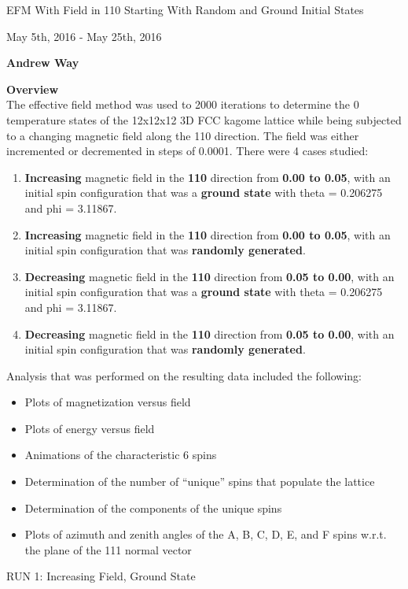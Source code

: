 \documentclass{article}
\begin{document}
\thispagestyle{plain}
\begin{center}
    \Large
    EFM With Field in 110 Starting With Random and Ground Initial States
    
    \vspace{0.4cm}
    \large
    May 5th, 2016 - May 25th, 2016
    
    \vspace{0.4cm}
    \textbf{Andrew Way}
    
    \vspace{0.9cm}
    \textbf{Overview} \\
    \vspace{5mm}
    The effective field method was used to 2000 iterations to determine the 0 temperature states of 
    the 12x12x12 3D FCC kagome lattice while being subjected to a changing magnetic field along the 110 
    direction. The field was either incremented or decremented in steps of 0.0001. 
    There were 4 cases studied:
    \begin{enumerate}
     \item \textbf{Increasing} magnetic field in the \textbf{110} direction from \textbf{0.00 to 0.05},
     with an initial 
     spin configuration that was a \textbf{ground state} with theta = 0.206275 and phi = 3.11867.
     \item \textbf{Increasing} magnetic field in the \textbf{110} direction from \textbf{0.00 to 0.05},
     with an initial 
     spin configuration that was \textbf{randomly generated}.
     \item \textbf{Decreasing} magnetic field in the \textbf{110} direction from \textbf{0.05 to 0.00},
     with an initial
     spin configuration that was a \textbf{ground state} with theta = 0.206275 and phi = 3.11867.
     \item \textbf{Decreasing} magnetic field in the \textbf{110} direction from \textbf{0.05 to 0.00},
     with an initial
     spin configuration that was \textbf{randomly generated}.
    \end{enumerate}
    Analysis that was performed on the resulting data included the following:
    \begin{itemize}
     \item Plots of magnetization versus field
     \item Plots of energy versus field
     \item Animations of the characteristic 6 spins 
     \item Determination of the number of ``unique'' spins that populate the lattice
     \item Determination of the components of the unique spins
     \item Plots of azimuth and zenith angles of the A, B, C, D, E, and F spins w.r.t. the plane of the 111 normal vector 
    \end{itemize}

\end{center}
\pagebreak
\thispagestyle{plain}
\begin{center}
\LARGE
RUN 1: Increasing Field, Ground State
\end{center}
\end{document}
